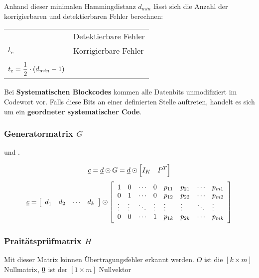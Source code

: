 \documentclass[a4paper]{article}
\begin{document}
\begin{twocolumn}
Anhand dieser minimalen Hammingdistanz $d_{min}$ lässt sich die Anzahl der korrigierbaren und detektierbaren Fehler berechnen:

\begin{tabular}{ll}
  \begin{dtabular}
    $t_d$ & Detektierbare Fehler \\
    $t_c$ & Korrigierbare Fehler \\
  \end{dtabular} &
  \begin{mtabular}{l}
    $t_d = d_{min} - 1$ \\
    $\displaystyle t_c=\frac{1}{2} \cdot (d_{min} - 1) $
  \end{mtabular}
\end{tabular}

Bei \textbf{Systematischen Blockcodes} kommen alle Datenbits unmodifiziert im Codewort vor. 
Falls diese Bits an einer definierten Stelle auftreten, handelt es sich um ein \textbf{geordneter systematischer Code}.

\subsubsection{Generatormatrix $G$}
 und .

$$\underline{c} = \underline{d} \odot G = \underline{d} \odot \left[ I_K \quad P^T \right]$$
$$\underline{c} = \left[ \begin{array}{llll} d_1 & d_2 & \cdots & d_k \end{array} \right] \odot 
  \left[ \begin{array}{llllllll} 
    1 & 0 & \cdots & 0 & p_{11} & p_{21} & \cdots & p_{m1} \\
    0 & 1 & \cdots & 0 & p_{12} & p_{22} & \cdots & p_{m2} \\
    \vdots & \vdots & \ddots & \vdots & \vdots & \vdots & \ddots & \vdots \\
    0 & 0 & \cdots & 1 & p_{1k} & p_{2k} & \cdots & p_{mk} \\
  \end{array} \right]
$$

\subsubsection{Praitätsprüfmatrix $H$}
Mit dieser Matrix können Übertragungsfehler erkannt werden. $O$ ist die $[k \times m]$ 
Nullmatrix, $\underline{0}$ ist der $[1 \times m]$ Nullvektor


\end{twocolumn}
\end{document}
